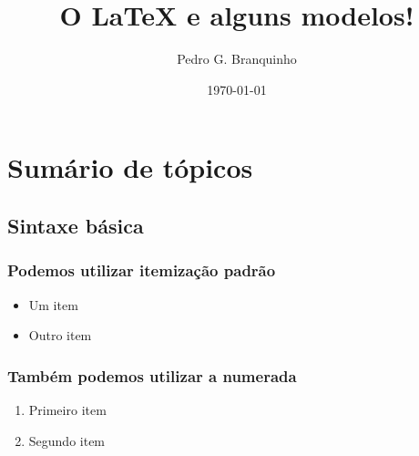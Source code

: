 \documentclass[presentation]{beamer}
\author{Pedro G. Branquinho}
\date{\today}
\title{O \LaTeX{} e alguns modelos!}
\begin{document}
\maketitle
\tableofcontents


\section{Sumário de tópicos}
\label{sec:org39c6b8d}
\subsection{Sintaxe básica}
\label{sec:org28c4b5b}
\subsubsection{Podemos utilizar itemização padrão}
\label{sec:org9aad965}
\begin{itemize}
\item Um item
\item Outro item
\end{itemize}

\subsubsection{Também podemos utilizar a numerada}
\label{sec:orgbf7f5a1}
\begin{enumerate}
\item Primeiro item
\item Segundo item
\end{enumerate}
\end{document}

